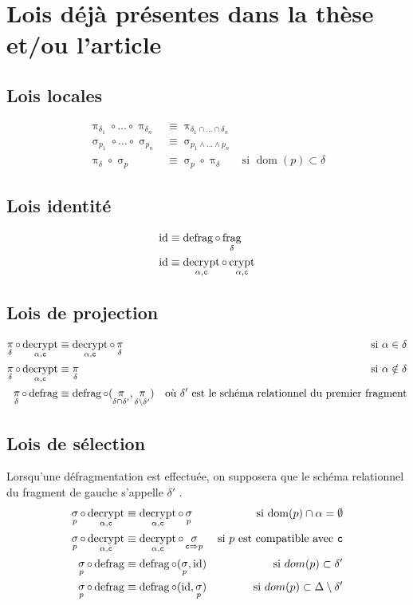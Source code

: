 \documentclass[french]{article}
\DeclareMathOperator{\proj}{\pi}
\DeclareMathOperator{\sel}{\sigma}
\DeclareMathOperator{\frag}{frag}
\DeclareMathOperator{\defrag}{defrag}
\DeclareMathOperator{\crypt}{crypt}
\DeclareMathOperator{\decrypt}{decrypt}
\DeclareMathOperator{\id}{id}
\DeclareMathOperator{\dom}{dom}
\newcommand\typeT[1]{\text{\ttfamily #1}}
\newcommand{\decryptArgs}[2]{\decrypt_{#1 , \typeT{#2}}}
\newcommand{\cryptArgs}[2]{\crypt_{#1 , \typeT{#2}}}
\newcommand{\projDelta}{\proj_{\delta}}
\newcommand{\selP}{\sel_p}
\newcommand{\decryptCAlpha}{\decryptArgs{\alpha}{c}}
\newcommand{\fragDelta}{\frag_{\delta}}
\begin{document}
\section*{Lois déjà présentes dans la thèse et/ou l'article}
\subsection*{Lois locales}
\begin{align}
	\proj_{\delta_1}\circ \dots \circ \proj_{\delta_n} 
	&\equiv \proj_{\delta_1 \cap \dots \cap \delta_n} \\
	\sel_{p_1} \circ \dots \circ \sel_{p_n}
	&\equiv \sel_{p_1 \wedge \dots \wedge p_n} \\
	\projDelta \circ \selP
	& \equiv \selP \circ \projDelta
	& \text{si $\dom(p) \subset \delta$}
\end{align}
\subsection*{Lois identité}
\begin{align}
	\id & \equiv \defrag \circ \fragDelta \\
	\id & \equiv \decryptArgs{\alpha}{c} \circ \cryptArgs{\alpha}{c}
\end{align}

\subsection*{Lois de projection}
\begin{align}
\projDelta \circ \decryptArgs{\alpha}{c}
& \equiv \decryptArgs{\alpha}{c} \circ \projDelta
&\text{si $\alpha \in \delta$}\\
\projDelta \circ \decryptArgs{\alpha}{c}
& \equiv \projDelta
&\text{si $\alpha \notin \delta$} \\
\projDelta \circ \defrag
& \equiv \defrag \circ (\proj_{\delta \cap \delta'}, \proj_{\delta \setminus \delta'})
& \text{où $\delta'$ est le schéma relationnel du premier fragment}
\end{align}

\subsection*{Lois de sélection}
Lorsqu'une défragmentation est effectuée, on supposera que le schéma relationnel
du fragment de gauche s'appelle $\delta'$ .
\begin{align}
\selP \circ \decryptCAlpha 
& \equiv \decryptCAlpha \circ \selP
& \text{si $\dom(p) \cap \alpha = \emptyset$} \\
\selP \circ \decryptCAlpha 
& \equiv \decryptCAlpha \circ \sel_{\typeT{c} \Rightarrow p}
& \text{si $p$  est compatible avec $\typeT{c}$} \\
\selP \circ \defrag 
& \equiv \defrag \circ (\selP, \id)
& \text{si $dom(p) \subset \delta'$} \\
\selP \circ \defrag 
& \equiv \defrag \circ (\id, \selP)
& \text{si $dom(p) \subset \Delta \setminus \delta'$}
\end{align}
 
\end{document}
